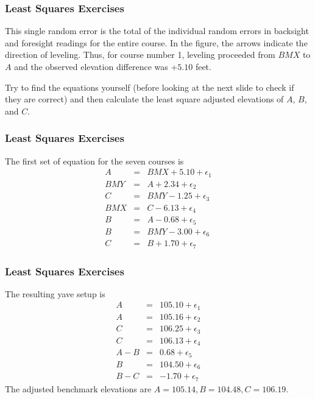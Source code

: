 \documentclass[xcolor=dvipsnames]{beamer}
\begin{document}
\begin{frame}
  \frametitle{Least Squares Exercises}
  This single random error is the total of the individual random
  errors in backsight and foresight readings for the entire course. In
  the figure, the arrows indicate the direction of leveling. Thus, for
  course number 1, leveling proceeded from $BMX$ to $A$ and the observed
  elevation difference was $+5.10$ feet.

\bigskip

  Try to find the equations yourself (before looking at the next slide
  to check if they are correct) and then calculate the least square
  adjusted elevations of $A$, $B$, and $C$.
\end{frame}

\begin{frame}
  \frametitle{Least Squares Exercises}
  The first set of equation for the seven courses is
  \begin{equation}
    \label{eq:aelaeghu}
    \begin{array}{rcl}
      A&=&BMX+5.10+\epsilon_{1} \\
      BMY&=&A+2.34+\epsilon_{2} \\
      C&=&BMY-1.25+\epsilon_{3} \\
      BMX&=&C-6.13+\epsilon_{4} \\
      B&=&A-0.68+\epsilon_{5} \\
      B&=&BMY-3.00+\epsilon_{6} \\
      C&=&B+1.70+\epsilon_{7}
    \end{array}
  \end{equation}
\end{frame}

\begin{frame}
  \frametitle{Least Squares Exercises}
  The resulting yave setup is
  \begin{equation}
    \label{eq:beephaht}
    \begin{array}{rcl}
      A&=&105.10+\epsilon_{1} \\
      A&=&105.16+\epsilon_{2} \\
      C&=&106.25+\epsilon_{3} \\
      C&=&106.13+\epsilon_{4} \\
      A-B&=&0.68+\epsilon_{5} \\
      B&=&104.50+\epsilon_{6} \\
      B-C&=&-1.70+\epsilon_{7}
    \end{array}
  \end{equation}
The adjusted benchmark elevations are $A=105.14,B=104.48,C=106.19$.
\end{frame}
\end{document}

